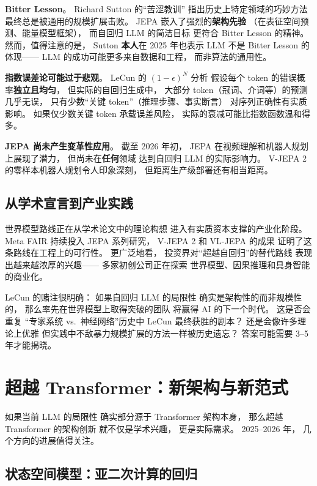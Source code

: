 \textbf{Bitter Lesson}。
Richard Sutton 的``苦涩教训''
指出历史上特定领域的巧妙方法
最终总是被通用的规模扩展击败。
JEPA 嵌入了强烈的\textbf{架构先验}
（在表征空间预测、能量模型框架），
而自回归 LLM 的简洁目标
更符合 Bitter Lesson 的精神。
然而，值得注意的是，
Sutton \textbf{本人}在 2025 年也表示
LLM 不是 Bitter Lesson 的体现——
LLM 的成功可能更多来自数据和工程，
而非算法的通用性。

\textbf{指数误差论可能过于悲观}。
LeCun 的 $(1-\epsilon)^N$ 分析
假设每个 token 的错误概率\textbf{独立且均匀}，
但实际的自回归生成中，
大部分 token（冠词、介词等）的预测几乎无误，
只有少数``关键 token''（推理步骤、事实断言）
对序列正确性有实质影响。
如果仅少数关键 token 承载误差风险，
实际的衰减可能比指数函数温和得多。

\textbf{JEPA 尚未产生变革性应用}。
截至 2026 年初，
JEPA 在视频理解和机器人规划上展现了潜力，
但尚未在\textbf{任何}领域
达到自回归 LLM 的实际影响力。
V-JEPA 2 的零样本机器人规划令人印象深刻，
但距离生产级部署还有相当距离。

\subsection{从学术宣言到产业实践}

世界模型路线正在从学术论文中的理论构想
进入有实质资本支撑的产业化阶段。
Meta FAIR 持续投入 JEPA 系列研究，
V-JEPA 2 和 VL-JEPA 的成果
证明了这条路线在工程上的可行性。
更广泛地看，
投资界对``超越自回归''的替代路线
表现出越来越浓厚的兴趣——
多家初创公司正在探索
世界模型、因果推理和具身智能的商业化。

LeCun 的赌注很明确：
如果自回归 LLM 的局限性
确实是架构性的而非规模性的，
那么率先在世界模型上取得突破的团队
将赢得 AI 的下一个时代。
这是否会重复
``专家系统 vs.\ 神经网络''历史中
LeCun 最终获胜的剧本？
还是会像许多理论上优雅
但实践中不敌暴力规模扩展的方法一样被历史遗忘？
答案可能需要 3--5 年才能揭晓。


\section{超越 Transformer：新架构与新范式}
\label{sec:beyond-transformer}

如果当前 LLM 的局限性
确实部分源于 Transformer 架构本身，
那么超越 Transformer 的架构创新
就不仅是学术兴趣，
更是实际需求。
2025--2026 年，
几个方向的进展值得关注。

\subsection{状态空间模型：亚二次计算的回归}

